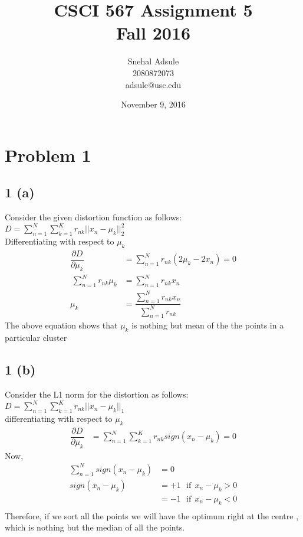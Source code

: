 \documentclass[10pt,letterpaper]{article}
\begin{document}
\title{CSCI 567 Assignment 5 \\Fall 2016}
\date{ November 9, 2016}
\author{Snehal Adsule\\2080872073\\adsule@usc.edu}
\maketitle

\section{Problem 1}
\subsection{1 (a) }
Consider the given distortion function as follows:\\
$D = \sum_{n=1}^{N}\sum_{k=1}^{K}r_{nk} ||x_{n} - \mu_{k}||_{2}^{2}$\\
Differentiating with respect to $\mu_k$
\begin{align*}
\dfrac{\partial D}{\partial \mu_{k}} &=  \sum_{n=1}^{N} r_{nk} (2\mu_{k} - 2x_{n}) = 0\\\
\sum_{n=1}^{N} r_{nk}\mu_{k} &= \sum_{n=1}^{N}r_{nk}x_{n}\\
\mu_{k} &= \dfrac{\sum_{n=1}^{N}r_{nk}x_{n}}{\sum_{n=1}^{N} r_{nk}}
\end{align*}
The above equation shows that  $\mu_k$ is nothing but mean of the the points in a particular cluster
\subsection{1 (b) }
Consider the L1 norm for the distortion as follows:\\
$D = \sum_{n=1}^{N}\sum_{k=1}^{K}r_{nk} ||x_{n} - \mu_{k}||_{1}$\\
differentiating with respect to $\mu_k$
\begin{align*}
\dfrac{\partial D}{\partial \mu_{k}} &= \sum_{n=1}^{N}\sum_{k=1}^{K}r_{nk} sign(x_{n} - \mu_{k}) = 0
\end{align*}
Now,
\begin{align*}
\sum_{n=1}^{N} sign(x_{n} - \mu_{k}) &= 0\\
sign(x_{n} - \mu_{k}) &= +1 ~~~\text{if}~~ x_{n} - \mu_{k}>0\\
&= -1 ~~~\text{if}~~ x_{n} - \mu_{k}<0\\
\end{align*}
Therefore, if we sort all the points we will have the optimum right at the centre , which is nothing but the median of all the points.
\end{document}
